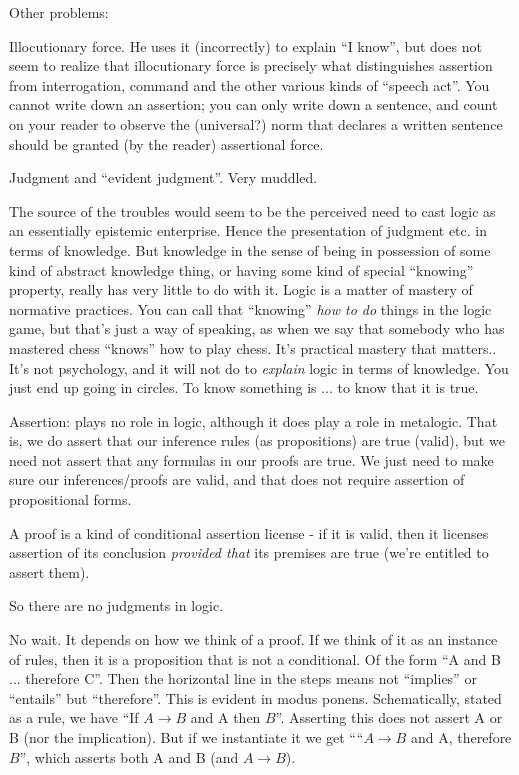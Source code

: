 \documentclass{article}
\begin{document}
\medskip

Other problems:

Illocutionary force. He uses it (incorrectly) to explain ``I know'',
but does not seem to realize that illocutionary force is precisely
what distinguishes assertion from interrogation, command and the other
various kinds of ``speech act''. You cannot write down an assertion;
you can only write down a sentence, and count on your reader to
observe the (universal?) norm that declares a written sentence should
be granted (by the reader) assertional force.

Judgment and ``evident judgment''. Very muddled.

The source of the troubles would seem to be the perceived need to cast
logic as an essentially epistemic enterprise. Hence the presentation
of judgment etc. in terms of knowledge. But knowledge in the sense of
being in possession of some kind of abstract knowledge thing, or
having some kind of special ``knowing'' property, really has very
little to do with it. Logic is a matter of mastery of normative
practices. You can call that ``knowing'' \textit{how to do} things in
the logic game, but that's just a way of speaking, as when we say that
somebody who has mastered chess ``knows'' how to play chess. It's
practical mastery that matters.. It's not psychology, and it will not
do to \textit{explain} logic in terms of knowledge. You just end up
going in circles. To know something is ... to know that it is true.

Assertion: plays no role in logic, although it does play a role in
metalogic. That is, we do assert that our inference rules (as
propositions) are true (valid), but we need not assert that any
formulas in our proofs are true. We just need to make sure our
inferences/proofs are valid, and that does not require assertion of
propositional forms.

A proof is a kind of conditional assertion license - if it is valid,
then it licenses assertion of its conclusion \textit{provided that}
its premises are true (we're entitled to assert them).

So there are no judgments in logic.

No wait. It depends on how we think of a proof. If we think of it as
an instance of rules, then it is a proposition that is not a
conditional. Of the form ``A and B ... therefore C''. Then the
horizontal line in the steps means not ``implies'' or ``entails'' but
``therefore''. This is evident in modus ponens. Schematically, stated
as a rule, we have ``If \(A\rightarrow B\) and A then \(B\)''.
Asserting this does not assert A or B (nor the implication). But if we
instantiate it we get ````\(A\rightarrow B\) and A, therefore \(B\)'',
which asserts both A and B (and \(A\rightarrow B\)).
\end{document}
